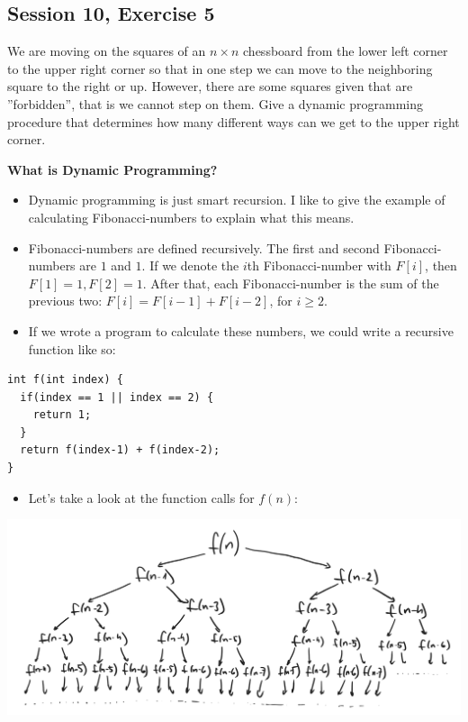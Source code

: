 \subsection {Session 10, Exercise 5}


We are moving on the squares of an $n \times n$ chessboard from the lower left corner to the upper right corner so that in one step we can move to the neighboring square to the right or up. However, there are some squares given that are ''forbidden'', that is we cannot step on them. Give a dynamic programming procedure that determines how many different ways can we get to the upper right corner.


\textbf{What is Dynamic Programming?}

\begin{itemize}
    \item Dynamic programming is just smart recursion. I like to give the example of calculating Fibonacci-numbers to explain what this means.
    \item Fibonacci-numbers are defined recursively. The first and second Fibonacci-numbers are $1$ and $1$. If we denote the $i$th Fibonacci-number with $F[i]$, then $F[1]=1, F[2]=1$. After that, each Fibonacci-number is the sum of the previous two: $F[i] = F[i-1] + F[i-2]$, for $i\geq{}2$.
    \item If we wrote a program to calculate these numbers, we could write a recursive function like so:
\end{itemize}


\begin{verbatim}
int f(int index) {
  if(index == 1 || index == 2) {
    return 1;
  }
  return f(index-1) + f(index-2);
}
\end{verbatim}

\begin{itemize}
    \item Let's take a look at the function calls for $f(n)$:
\end{itemize}

\begin{center}
    \includegraphics[width=\linewidth]{10/05/fibonacci_recursive.png}
\end{center}

